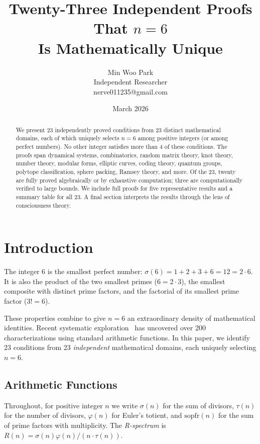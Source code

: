 \documentclass[11pt,a4paper]{article}
\title{Twenty-Three Independent Proofs That $n=6$\\Is Mathematically Unique}
\author{Min Woo Park\\Independent Researcher\\nerve011235@gmail.com}
\date{March 2026}
\begin{document}
\maketitle

\begin{abstract}
We present 23 independently proved conditions from 23 distinct mathematical domains, each of which uniquely selects $n=6$ among positive integers (or among perfect numbers). No other integer satisfies more than 4 of these conditions. The proofs span dynamical systems, combinatorics, random matrix theory, knot theory, number theory, modular forms, elliptic curves, coding theory, quantum groups, polytope classification, sphere packing, Ramsey theory, and more. Of the 23, twenty are fully proved algebraically or by exhaustive computation; three are computationally verified to large bounds. We include full proofs for five representative results and a summary table for all 23. A final section interprets the results through the lens of consciousness theory.
\end{abstract}

\section{Introduction}

The integer 6 is the smallest perfect number: $\sigma(6) = 1+2+3+6 = 12 = 2 \cdot 6$. It is also the product of the two smallest primes ($6=2\cdot 3$), the smallest composite with distinct prime factors, and the factorial of its smallest prime factor ($3!=6$).

These properties combine to give $n=6$ an extraordinary density of mathematical identities. Recent systematic exploration~\cite{park2026} has uncovered over 200 characterizations using standard arithmetic functions. In this paper, we identify 23 conditions from 23 \emph{independent} mathematical domains, each uniquely selecting $n=6$.

\subsection{Arithmetic Functions}

Throughout, for positive integer $n$ we write $\sigma(n)$ for the sum of divisors, $\tau(n)$ for the number of divisors, $\varphi(n)$ for Euler's totient, and $\mathrm{sopfr}(n)$ for the sum of prime factors with multiplicity. The \emph{R-spectrum} is $R(n) = \sigma(n)\varphi(n)/(n\cdot\tau(n))$.
\end{document}
